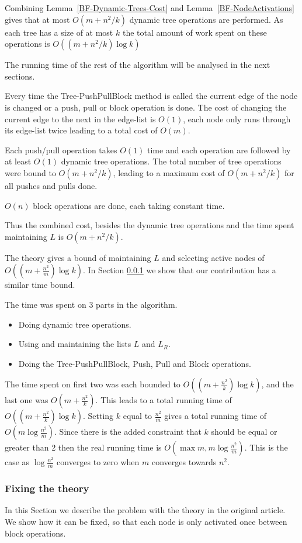 Combining Lemma~\ref{BF-Dynamic-Trees-Cost} and Lemma~\ref{BF-NodeActivations} gives that at most $O(m+ n^2/k)$ dynamic tree operations are performed.
As each tree has a size of at most $k$ the total amount of work spent on these operations is $O\left((m+ n^2/k)\log{k}\right)$ 

The running time of the rest of the algorithm will be analysed in the next sections.

Every time the Tree-PushPullBlock method is called the current edge of the node is changed or a push, pull or block operation is done.
The cost of changing the current edge to the next in the edge-list is $O(1)$, each node only runs through its edge-list twice leading to a total cost of $O(m)$.

Each push/pull operation takes $O(1)$ time and each operation are followed by at least $O(1)$ dynamic tree operations. 
The total number of tree operations were bound to $O(m+ n^2/k)$, leading to a maximum cost of $O(m+ n^2/k)$ for all pushes and pulls done.

$O(n)$ block operations are done, each taking constant time.

Thus the combined cost, besides the dynamic tree operations and the time spent maintaining $L$ is $O(m+ n^2/k)$.

The theory gives a bound of maintaining $L$ and selecting active nodes of $O((m+\frac{n^2}{m})\log{k})$. 
In Section \ref{gr-fixing} we show that our contribution has a similar time bound.

The time was spent on 3 parts in the algorithm.
\begin{itemize}
\item Doing dynamic tree operations. 
\item Using and maintaining the lists $L$ and $L_R$. 
\item Doing the Tree-PushPullBlock, Push, Pull and Block operations.
\end{itemize}
The time spent on first two was each bounded to $O((m+\frac{n^2}{k})\log{k})$, and the last one was $O(m+\frac{n^2}{k})$.
This leads to a total running time of $O((m+\frac{n^2}{k})\log{k})$. Setting $k$ equal to $\frac{n^2}{m}$
gives a total running time of $O(m\log{\frac{n^2}{m}})$. Since there is the added constraint that $k$ should
be equal or greater than 2 then the real running time is $O(\max{m,m\log{\frac{n^2}{m}}})$. This is the case as $\log{\frac{n^2}{m}}$
converges to zero when $m$ converges towards $n^2$.

\subsubsection{Fixing the theory} \label{gr-fixing}
In this Section we describe the problem with the theory in the original article. We show how it can be fixed, so that each node is only activated
once between block operations.

